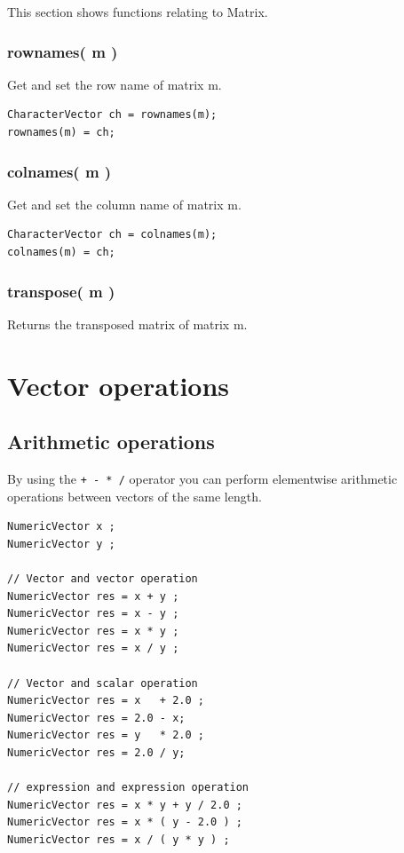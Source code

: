 \documentclass[]{book}
\theoremstyle{definition}
\theoremstyle{definition}
\theoremstyle{remark}
\begin{document}
This section shows functions relating to Matrix.

\subsection{rownames( m )}\label{rownames-m}

Get and set the row name of matrix m.

\begin{verbatim}
CharacterVector ch = rownames(m);
rownames(m) = ch;
\end{verbatim}

\subsection{colnames( m )}\label{colnames-m}

Get and set the column name of matrix m.

\begin{verbatim}
CharacterVector ch = colnames(m);
colnames(m) = ch;
\end{verbatim}

\subsection{transpose( m )}\label{transpose-m}

Returns the transposed matrix of matrix m.

\chapter{Vector operations}\label{vector-operations}

\section{Arithmetic operations}\label{arithmetic-operations}

By using the \texttt{+\ -\ *\ /} operator you can perform elementwise
arithmetic operations between vectors of the same length.

\begin{verbatim}
NumericVector x ;
NumericVector y ;

// Vector and vector operation
NumericVector res = x + y ;
NumericVector res = x - y ;
NumericVector res = x * y ;
NumericVector res = x / y ;

// Vector and scalar operation
NumericVector res = x   + 2.0 ;
NumericVector res = 2.0 - x;
NumericVector res = y   * 2.0 ;
NumericVector res = 2.0 / y;

// expression and expression operation
NumericVector res = x * y + y / 2.0 ;
NumericVector res = x * ( y - 2.0 ) ;
NumericVector res = x / ( y * y ) ;
\end{verbatim}
\end{document}
